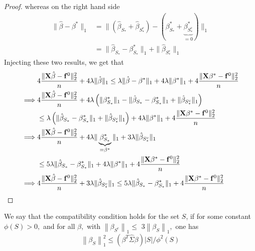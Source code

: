 \begin{proof}
    whereas on the right hand side
    \begin{align*}
        \|\hat{\beta}-\beta^{*} \|_{1}
         & =  \| (\hat{\beta}_{S_{*}} + \hat{\beta}_{S_{*}^{c}}) - (\beta_{S_{*}}^{*} + \underbrace{\beta_{S_{*}^{c}}^*}_{=0}) \|_{1} \\
         & =  \| \hat{\beta}_{S_{*}}-\beta_{S_{*}}^{*} \|_{1} + \|\hat{\beta}_{S_{*}^{c}} \|_{1}
    \end{align*}
    Injecting these two results, we get that
    \begin{align*}
                 & 4 \frac{\| \mathbf{X} \hat \beta - \mathbf{f}^0 \|_{2}^{2}}{n} + 4 \lambda\| \hat \beta \|_{1} \leq \lambda \| \hat\beta - \beta^* \|_{1} + 4 \lambda \| \beta^*\|_{1} + 4\frac{\|\mathbf{X} \beta^* - \mathbf{f}^0\|_{2}^{2}}{n} \\
        \implies &
        4 \frac{\| \mathbf{X} \hat \beta - \mathbf{f}^0 \|_{2}^{2}}{n} + 4 \lambda \left( \|\beta_{S_{*}}^{*} \|_{1} - \|\hat{\beta}_{S_{*}}-\beta_{S_{*}}^{*} \|_{1}+ \|\hat{\beta}_{S_{*}^{c}} \|_{1} \right)                              \\
                 & \leq \lambda \left( \| \hat{\beta}_{S_{*}}-\beta_{S_{*}}^{*} \|_{1} + \|\hat{\beta}_{S_{*}^{c}} \|_{1} \right) + 4 \lambda \| \beta^*\|_{1} + 4\frac{\|\mathbf{X} \beta^* - \mathbf{f}^0\|_{2}^{2}}{n}                    \\
        \implies &
        4 \frac{\| \mathbf{X} \hat \beta - \mathbf{f}^0 \|_{2}^{2}}{n} + 4 \lambda \| \underbrace{\beta_{S_{*}}^{*}}_{= \beta^{*}} \|_{1} + 3 \lambda\|\hat{\beta}_{S_{*}^{c}} \|_{1}                                                        \\
                 & \leq 5 \lambda \| \hat{\beta}_{S_{*}}-\beta_{S_{*}}^{*} \|_{1} + 4 \lambda \| \beta^*\|_{1} + 4\frac{\|\mathbf{X} \beta^* - \mathbf{f}^0\|_{2}^{2}}{n}                                                                    \\
        \implies &
        4 \frac{\| \mathbf{X} \hat \beta - \mathbf{f}^0 \|_{2}^{2}}{n} + 3 \lambda\|\hat{\beta}_{S_{*}^{c}} \|_{1} \leq 5 \lambda \| \hat{\beta}_{S_{*}}-\beta_{S_{*}}^{*} \|_{1} + 4\frac{\|\mathbf{X} \beta^* - \mathbf{f}^0\|_{2}^{2}}{n}         \\
    \end{align*}
\end{proof}

\begin{definition}
    We say that the compatibility condition holds for the set $S$, if for some constant $\phi(S)>0,$ and for all $\beta,$ with $\left\|\beta_{S^{c}}\right\|_{1} \leq$ $3\left\|\beta_{S}\right\|_{1},$ one has
    $$
        \left\|\beta_{S}\right\|_{1}^{2} \leq\left(\beta^{T} \hat{\Sigma} \beta\right)|S| / \phi^{2}(S)
    $$
\end{definition}



